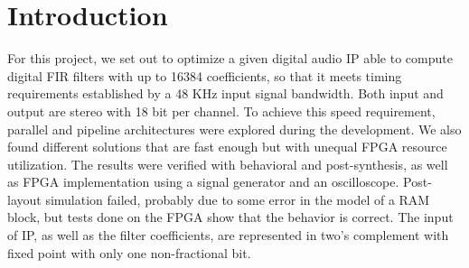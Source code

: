 \documentclass[12pt]{article}
\begin{document}
{
	
	\pagestyle{empty}
	\titleAT
	\newpage
}
\setcounter{page}{1}

\section{Introduction}

For this project, we set out to optimize a given digital audio IP able to compute digital FIR
filters with up to 16384 coefficients, so that it meets timing requirements established by a 48 KHz
input signal bandwidth. Both input and output are stereo with 18 bit per channel. To achieve this
speed requirement, parallel and pipeline architectures were explored during the development. We also
found different solutions that are fast enough but with unequal FPGA resource utilization. The
results were verified with behavioral and post-synthesis, as well as FPGA implementation using a
signal generator and an oscilloscope. Post-layout simulation failed, probably due to some error in
the model of a RAM block, but tests done on the FPGA show that the behavior is correct.
The input of IP, as well as the filter coefficients, are represented in two's complement with fixed
point with only one non-fractional bit. 
\end{document}

